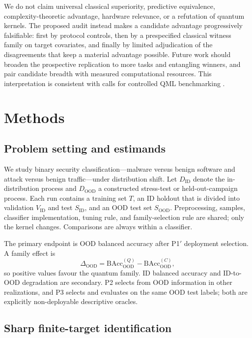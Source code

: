 \documentclass[referee,lineno,pdflatex,sn-vancouver-num]{sn-jnl}
\theoremstyle{thmstyleone}%
\theoremstyle{thmstyletwo}%
\theoremstyle{thmstylethree}%
\begin{document}
We do not claim universal classical superiority, predictive equivalence, complexity-theoretic advantage, hardware relevance, or a refutation of quantum kernels. The proposed audit instead makes a candidate advantage progressively falsifiable: first by protocol controls, then by a prespecified classical witness family on target covariates, and finally by limited adjudication of the disagreements that keep a material advantage possible. Future work should broaden the prospective replication to more tasks and entangling winners, and pair candidate breadth with measured computational resources. This interpretation is consistent with calls for controlled QML benchmarking \cite{bowles2024betterthanclassical,schnabel2025scrutiny,kakavand2026benchmarking}.

\section{Methods}
\label{sec:methods}

\subsection{Problem setting and estimands}

We study binary security classification---malware versus benign software and attack versus benign traffic---under distribution shift. Let $D_{\mathrm{ID}}$ denote the in-distribution process and $D_{\mathrm{OOD}}$ a constructed stress-test or held-out-campaign process. Each run contains a training set $T$, an ID holdout that is divided into validation $V_{\mathrm{ID}}$ and test $S_{\mathrm{ID}}$, and an OOD test set $S_{\mathrm{OOD}}$. Preprocessing, samples, classifier implementation, tuning rule, and family-selection rule are shared; only the kernel changes. Comparisons are always within a classifier.

The primary endpoint is OOD balanced accuracy after P1$'$ deployment selection. A family effect is
\[
\Delta_{\mathrm{OOD}}=
\mathrm{BAcc}^{(Q)}_{\mathrm{OOD}}-
\mathrm{BAcc}^{(C)}_{\mathrm{OOD}},
\]
so positive values favour the quantum family. ID balanced accuracy and ID-to-OOD degradation are secondary. P2 selects from OOD information in other realizations, and P3 selects and evaluates on the same OOD test labels; both are explicitly non-deployable descriptive oracles.

\subsection{Sharp finite-target identification}
\label{sec:methods_identification}
\end{document}
